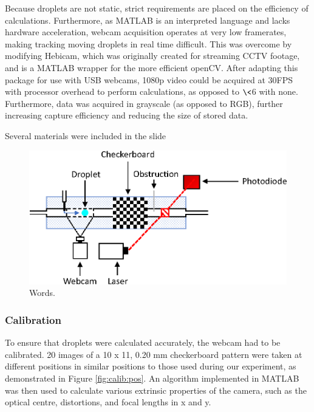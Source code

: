 \documentclass{physics_article_B}
\begin{document}
        Because droplets are not static, strict requirements are placed on the efficiency of calculations. Furthermore, as MATLAB is an interpreted language and lacks hardware acceleration, webcam acquisition operates at very low framerates, making tracking moving droplets in real time difficult. This was overcome by modifying Hebicam\cite{HebiCam}, which was originally created for streaming CCTV footage, and is a MATLAB wrapper for the more efficient openCV. After adapting this package for use with USB webcams, 1080p video could be acquired at 30FPS with processor overhead to perform calculations, as opposed to $\<$6 with none. Furthermore, data was acquired in grayscale (as opposed to RGB), further increasing capture efficiency and reducing the size of stored data. 
        
        Several materials were included in the slide

        \begin{figure}[H]
        \centering
        \hspace*{-0.9cm}\includegraphics[scale=0.8]{Figures/Control.eps}
        \captionsetup{justification=centering}
        \caption{Words.} 	
        \label{fig:basic}
        \end{figure} 
        
        \subsubsection{Calibration}
        
        To ensure that droplets were calculated accurately, the webcam had to be calibrated. 20 images of a 10 x 11, 0.20 mm checkerboard pattern were taken at different positions in similar positions to those used during our experiment, as demonstrated in Figure \ref{fig:calib:pos}. An algorithm implemented in MATLAB\cite{CameraCalib} was then used to calculate various extrinsic properties of the camera, such as the optical centre, distortions, and focal lengths in x and y. 
        
\end{document}
